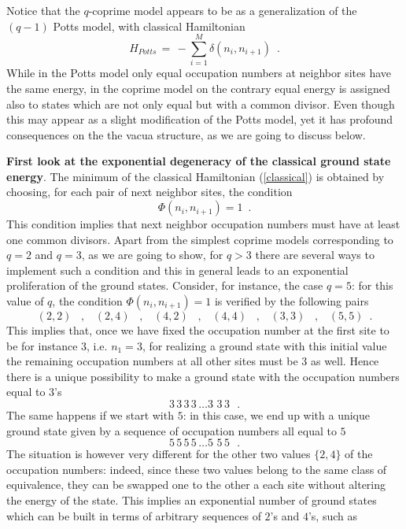 \documentclass[aps,pra,superscriptaddress]{revtex4}
\newcommand\be            {\begin{equation}}
\newcommand\ee            {\end{equation}}
\renewcommand{\(}{\left(}
\renewcommand{\)}{\right)}
\renewcommand{\[}{\left[}
\renewcommand{\]}{\right]}
\begin{document}
Notice that the $q$-coprime model appears to be as a generalization of the $(q-1)$ Potts model, with classical Hamiltonian 
\be
H_{Potts} \,=\, - \sum_{i=1}^M \delta(n_i,n_{i+1}) \,\,\,.
\label{Potts}
\ee
While in the Potts model only equal occupation numbers at neighbor sites have the same energy, in the coprime model on the contrary equal 
energy is assigned also to states which are not only equal but with a common divisor. Even though this may appear as a slight modification of the 
Potts model, yet it has profound consequences on the the vacua structure, as we are going to discuss below. 

\vspace{3mm}
\noindent
{\bf First look at the exponential degeneracy of the classical ground state energy}. The minimum of the classical Hamiltonian (\ref{classical}) is 
obtained by choosing, for each pair of next neighbor sites, the condition 
\be 
\Phi(n_i,n_{i+1}) =1 \,\,\,.
\ee
This condition implies that next neighbor occupation numbers must have at least one common divisors. Apart from the simplest coprime models corresponding to $q=2$ and $q=3$, as we are going to show, for $q > 3$ there are several ways to implement such a condition and this in general leads to an exponential proliferation of the ground states. Consider, for instance, the case $q=5$: for this value of $q$, the condition $\Phi(n_i,n_{i+1}) =1$ is verified by the following pairs 
\be
(2,2)
\,\,\,\,\,
,
\,\,\,\,\,
(2,4) 
\,\,\,\,\,
,
\,\,\,\,\,
(4,2) 
\,\,\,\,\,
,
\,\,\,\,\,
(4,4) 
\,\,\,\,\,
,
\,\,\,\,\,
(3,3)
\,\,\,\,\,
,
\,\,\,\,\,
(5,5) \,\,\,. 
\ee
This implies that, once we have fixed the occupation number at the first site to be for instance $3$, i.e. $n_1 = 3$, for realizing a ground state with this initial value the remaining occupation numbers at all other sites must be $3$ as well. Hence there is a unique possibility to make a ground state 
with the occupation numbers equal to $3$'s
\be
3 \, 3\, 3\, 3\, \ldots 3\,\,3 \, 3\,\,\,\,.
\ee  
The same happens if we start with $5$: in this case, we end up with a unique ground state given by a sequence of occupation numbers 
all equal to $5$ 
\be
5 \, 5\, 5\, 5\, \ldots 5\,\,5 \, 5\,\,\,\,.
\ee
The situation is however very different for the other two values $\{2, 4\}$ of the occupation numbers: indeed, since these two values 
belong to the same class of equivalence, they can be swapped one to the other a each site without altering the energy of the state. 
This implies an exponential number of ground states which can be built in terms of arbitrary sequences of $2$'s and $4$'s, such as 
\end{document}
